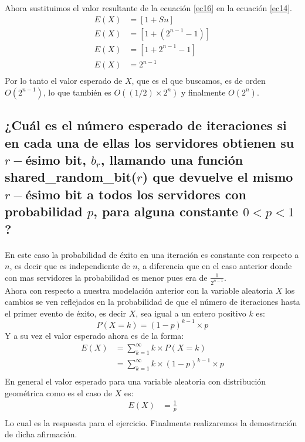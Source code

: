 \documentclass[12pt]{article}
\begin{document}
Ahora sustituimos el valor resultante de la ecuación \ref{ec16} en la ecuación \ref{ec14}.\\
\begin{equation}
\begin{split}
E(X) & =   [1 + Sn]\\
E(X) & =   [1 + (2^{n-1} - 1)]\\
E(X) & =   [1 + 2^{n-1} - 1]\\
E(X) & =   2^{n-1}\\
\end{split}
\end{equation}
Por lo tanto el valor esperado de $X$, que es el que buscamos, es de orden $O(2^{n-1})$, lo que también es $O((1/2) \times 2^{n})$ y finalmente $O(2^n)$.\\
\subsection{¿Cuál es el número esperado de iteraciones si en cada una de ellas los servidores obtienen su $r-$ésimo bit, $b_r$, llamando una función \textbf{shared\_random\_bit($r$)} que devuelve el mismo $r-$ésimo bit a todos los servidores con probabilidad $p$, para alguna constante $0 < p < 1$?}
\paragraph{} En este caso la probabilidad de éxito en una iteración es constante con respecto a $n$, es decir que es independiente de $n$, a diferencia que en el caso anterior donde con mas servidores la probabilidad es menor pues era de $\frac{1}{2^{n-1}}$.\\
Ahora con respecto a nuestra modelación anterior con la variable aleatoria $X$ los cambios se ven reflejados en la probabilidad de que el número de iteraciones hasta el primer evento de éxito, es decir $X$, sea igual a un entero positivo $k$ es:\\
\begin{equation}
P(X=k)= (1 - p)^{k-1} \times p
\end{equation}
Y a su vez el valor esperado ahora es de la forma:\\
\begin{equation}\label{ec19}
\begin{split}
E(X) &= \sum_{k=1}^{\infty}{k \times P(X=k)} \\
&= \sum_{k=1}^{\infty}{k \times (1 - p)^{k-1} \times p}\\
\end{split}
\end{equation}
En general el valor esperado para una variable aleatoria con distribución geométrica como es el caso de $X$ es:\\
\begin{equation}\label{ec20}
\begin{split}
E(X) &= \frac{1}{p} \\
\end{split}
\end{equation}
Lo cual es la respuesta para el ejercicio. Finalmente realizaremos la demostración de dicha afirmación.\\
\end{document}
